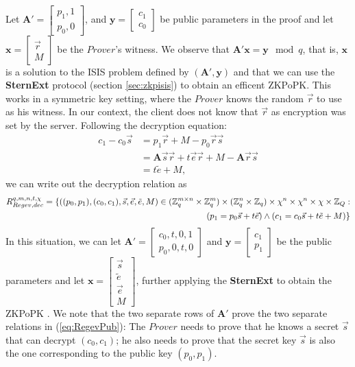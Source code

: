 Let $\mathbf{A}' = \begin{bmatrix}
  p_1, 1\\
  p_0, 0
\end{bmatrix}
$, and $\mathbf{y} = \begin{bmatrix}
  c_1\\c_0
\end{bmatrix}$ be public parameters in the proof and
let $\mathbf{x} = \begin{bmatrix}
  \vec{r}\\
  M
\end{bmatrix}$
be the $Prover$'s witness. We observe that $\mathbf{A'}\mathbf{x}= \mathbf{y} \mod q$, that is, $\mathbf{x}$ is a solution
to the ISIS problem defined by $(\mathbf{A'},\mathbf{y})$ and that we can use the \textbf{SternExt} protocol (section
\ref{sec:zkpisis}) to obtain an efficent ZKPoPK. This works in a symmetric key setting, where the $Prover$ knows
the random $\vec{r}$ to use as his witness. In our context, the client does not know that $\vec{r}$ as encryption was
set by the server. Following the decryption equation:
\begin{align*}
  c_1 - c_0\vec{s} &= p_1\vec{r} + M - p_0\vec{r}\vec{s} \\
                   &= \mathbf{A}\vec{s}\vec{r} + t\vec{e}\vec{r} + M - \mathbf{A}\vec{r}\vec{s}\\
                   &= t\tilde{e} + M,
\end{align*}
we can write out the decryption relation as
\begin{align}
  \label{eq:RegevPub}
  R_{Regev,dec}^{q,m,n,t,\chi} = \{ ((p_0,p_1),(c_0,c_1),\vec{s},\vec{e},\tilde{e}, M) \in (\mathbb{Z}_q^{m \times n} \times \mathbb{Z}_q^{m})
  \times (\mathbb{Z}_q^n \times \mathbb{Z}_q) \times \chi^n \times \chi^n \times \chi \times \mathbb{Z}_Q :\\ \nonumber
  (p_1 = p_0\vec{s} + t\vec{e}) \land (c_1 = c_0\vec{s} + t\tilde{e} + M) \}
\end{align}
In this situation, we can let $\mathbf{A'} = \begin{bmatrix}
  c_0, t, 0 , 1 \\p_0, 0, t, 0
\end{bmatrix}
$
and $\mathbf{y} = \begin{bmatrix}
  c_1\\p_1
\end{bmatrix}$
be the public parameters and let $\mathbf{x} = \begin{bmatrix}
  \vec{s}\\ \tilde{e}\\ \vec{e}\\ M
\end{bmatrix}
$, further applying the \textbf{SternExt} to obtain the ZKPoPK  . We note that the two separate rows of $\mathbf{A'}$ prove the two
separate relations in (\ref{eq:RegevPub}): The $Prover$ needs to prove that he knows a secret $\vec{s}$ that can decrypt
$(c_0,c_1)$; he also needs to prove that the secret key $\vec{s}$ is also the one corresponding to the public key
$(p_0, p_1)$.


